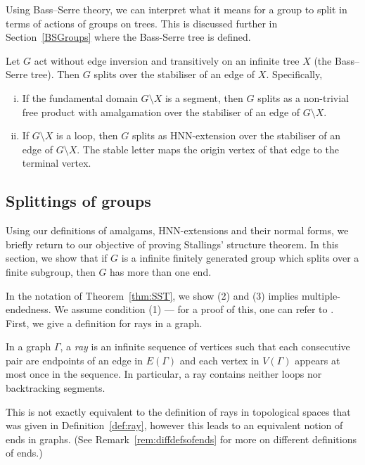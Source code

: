 Using Bass--Serre theory, we can interpret what it means for a group to split in terms of actions of groups on trees. This is discussed further in Section~\ref{BSGroups} where the Bass-Serre tree is defined.

\begin{theorem}
\label{thm:bassserre}
     Let \(G\) act without edge inversion and transitively on an infinite tree \(X\) (the Bass--Serre tree). Then \(G\) splits over the stabiliser of an edge of \(X\). Specifically,
\begin{enumerate}[(i)]
    \item If the fundamental domain \(G \setminus X\) is a segment, then \(G\) splits as a non-trivial free product with amalgamation over the stabiliser of an edge of \(G \setminus X\). 
    \item If \(G \setminus X\) is a loop, then \(G\) splits as HNN-extension over the stabiliser of an edge of \(G \setminus X\). The stable letter maps the origin vertex of that edge to the terminal vertex.
\end{enumerate}
\end{theorem}

\subsection{Splittings of groups}
  Using our definitions of amalgams, HNN-extensions and their normal forms, we briefly return to our objective of proving Stallings' structure theorem. In this section, we show that if \(G\) is a infinite finitely generated group which splits over a finite subgroup, then \(G\) has more than one end. 
  
  In the notation of Theorem~\ref{thm:SST}, we show (2) and (3) implies multiple-endedness. We assume condition (1) --- for a proof of this, one can refer to \cite[Chapter 11.6, Corollary 11.34]{M08}. First, we give a definition for rays in a graph.

\begin{definition}
    In a graph \(\Gamma\), a \emph{ray} is an infinite sequence of vertices such that each consecutive pair are endpoints of an edge in \(E(\Gamma)\) and each vertex in \(V(\Gamma)\) appears at most once in the sequence. In particular, a ray contains neither loops nor backtracking segments.
\end{definition}

\begin{caveat}
    This is not exactly equivalent to the definition of rays in topological spaces that was given in Definition~\ref{def:ray}, however this leads to an equivalent notion of ends in graphs. (See Remark~\ref{rem:diffdefsofends} for more on different definitions of ends.)
\end{caveat}
  
